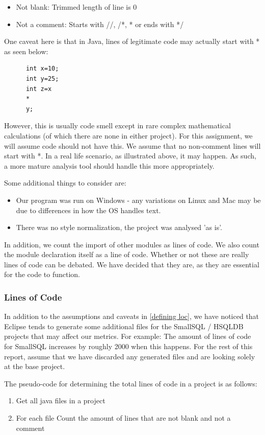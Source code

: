 \documentclass{article}
\begin{document}
\begin{itemize}
\item Not blank: Trimmed length of line is 0
\item Not a comment: Starts with //, /*, * or ends with */
\end{itemize}

One caveat here is that in Java, lines of legitimate code may actually start with * as seen below:
\begin{lstlisting}
      int x=10;
      int y=25;
      int z=x
      *
      y;
\end{lstlisting}

However, this is usually code smell except in rare complex mathematical calculations (of which there are none in either project). For this assignment, we will assume code should not have this. We assume that no non-comment lines will start with *.
In a real life scenario, as illustrated above, it may happen. As such, a more mature analysis tool should handle this more appropriately.

Some additional things to consider are:
\begin{itemize}
\item Our program was run on Windows - any variations on Linux and Mac may be due to differences in how the OS handles text. 
\item There was no style normalization, the project was analysed 'as is'.
\end{itemize}

In addition, we count the import of other modules as lines of code. We also count the module declaration itself as a line of code. Whether or not these are really lines of code can be debated. We have decided that they are, as they are essential for the code to function.

\subsubsection{Lines of Code}
In addition to the assumptions and caveats in \ref{defining loc}, we have noticed that Eclipse tends to generate some additional files for the SmallSQL / HSQLDB projects that may affect our metrics. For example: The amount of lines of code for SmallSQL increases by roughly 2000 when this happens.
For the rest of this report, assume that we have discarded any generated files and are looking solely at the base project.

The pseudo-code for determining the total lines of code in a project is as follows:
\begin{enumerate}
\item Get all java files in a project
\item For each file
\subitem Count the amount of lines that are not blank and not a comment
\end{enumerate}
\end{document}
